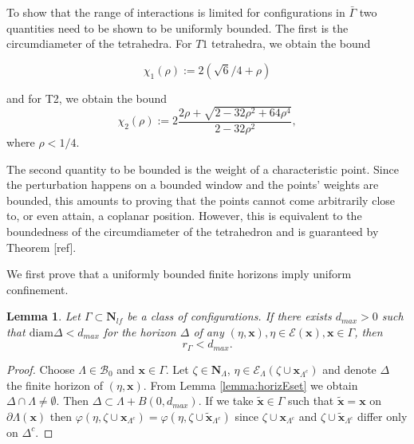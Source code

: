 \documentclass{kybernetika}
\newtheorem{lemma}[theorem]{Lemma}
\newcommand{\x}{{\mathbf{x}}}
\begin{document}
To show that the range of interactions is limited for configurations in $\bar \Gamma$ two quantities need to be shown to be uniformly bounded. 
The first is the circumdiameter of the tetrahedra. 
For $T1$ tetrahedra, we obtain the bound

$$\chi_1(\rho) := 2(\sqrt 6/4 + \rho)$$

and for T2, we obtain the bound
$$\chi_2(\rho) := 2 \frac{2\rho + \sqrt{2 - 32\rho^2 + 64 \rho^4}}{2-32\rho^2},$$
where $\rho < 1/4$. 


The second quantity to be bounded is the weight of a characteristic point. Since the perturbation happens on a bounded window and the points' weights are bounded, this amounts to proving that the points cannot come arbitrarily close to, or even attain, a coplanar position.
 However, this is equivalent to the boundedness of the circumdiameter of the tetrahedron and is guaranteed by Theorem [ref].


We first prove that a uniformly bounded finite horizons imply uniform confinement. 


\begin{lemma}\label{lemma:U1}
	Let $\Gamma \subset \mathbf N_{lf}$ be a class of configurations. If there exists $d_{max}>0$ such that $\mathrm{diam}\Delta < d_{max}$ for the horizon $\Delta$ of any $(\eta,\x), \eta \in \mathcal E(\x), \x \in \Gamma$, then 
	$$r_\Gamma < d_{max}.$$
\end{lemma}
\begin{proof}
	Choose $\Lambda\in \mathcal B_0$ and $\x \in \Gamma$. Let $\zeta \in \mathbf N_\Lambda$,  $\eta \in \mathcal E_\Lambda(\zeta \cup \x_{\Lambda^c})$ and denote $\Delta$ the finite horizon of $(\eta,\x)$. From Lemma \ref{lemma:horizEset} we obtain $\Delta\cap\Lambda \neq \emptyset$. Then $\Delta \subset \Lambda + B(0,d_{max})$. If we take $\tilde\x \in \Gamma$ such that $\tilde\x = \x$ on $\partial\Lambda(\x)$ then $\varphi(\eta,\zeta \cup \x_{\Lambda^c}) = \varphi(\eta,\zeta\cup \tilde \x_{\Lambda^c})$ since $\zeta\cup\x_{\Lambda^c}$ and $\zeta\cup\tilde\x_{\Lambda^c}$ differ only on $\Delta^c$.
\end{proof}
\end{document}
